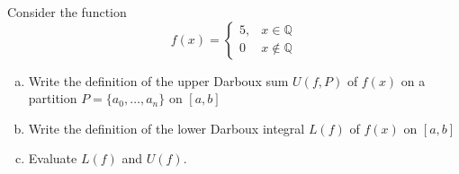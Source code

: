 \documentclass[11pt]{exam}
\theoremstyle{definition}
\begin{document}
\begin{questions}
\newpage
\question[10]\mbox{}

Consider the function
$$f(x) = \left\lbrace\begin{array}{cc}5, & x\in \mathbb{Q}\\0 & x\notin\mathbb{Q}\end{array}\right.$$

\begin{enumerate}[(a)]
\item  Write the definition of the upper Darboux sum $U(f,P)$ of $f(x)$ on a partition $P = \{a_0,\dots, a_n\}$ on $[a,b]$
\vspace{1.5in}
\item Write the definition of the lower Darboux integral $L(f)$ of $f(x)$ on $[a,b]$
\vspace{1.5in}
\item 
Evaluate $L(f)$ and $U(f)$.
\end{enumerate}


\end{questions}
\end{document}
